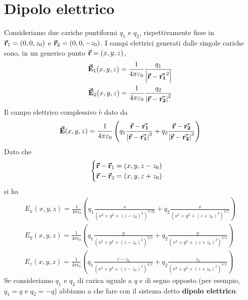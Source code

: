 \section{Dipolo elettrico}
Consideriamo due cariche puntiformi $q_1$ e $q_2$, rispettivamente fisse in $\vb*{\va{r}}_1=\left(0,0,z_0\right)$ e $\vb*{\va{r}}_2=\left(0,0,-z_0\right)$. I campi elettrici generati dalle singole cariche sono, in un generico punto $\vb*{\va{r}}=(x,y,z)$,
\begin{gather*}
	\vb*{\va{E}}_1(x,y,z)=\frac{1}{4\pi\varepsilon_0}\frac{q_1}{\abs{\vb*{\va{r}}-\vb*{\va{r_1}}^2}}\\
	\vb*{\va{E}}_2(x,y,z)=\frac{1}{4\pi\varepsilon_0}\frac{q_2}{\abs{\vb*{\va{r}}-\vb*{\va{r_2}}}^2}
\end{gather*}
Il campo elettrico complessivo è dato da
\begin{equation}
	\vb*{\va{E}}(x,y,z)=\frac{1}{4\pi\varepsilon_0}\left(q_1\frac{\vb*{\va{r}}-\vb*{\va{r_1}}}{\abs{\vb*{\va{r}}-\vb*{\va{r_1}}}^3}+q_2\frac{\vb*{\va{r}}-\vb*{\va{r_2}}}{\abs{\vb*{\va{r}}-\vb*{\va{r_2}}}^3}\right)
\end{equation}
Dato che
\begin{equation*}
	\begin{cases}
		\vb*{\va{r}}-\vb*{\va{r}}_1=\left(x,y,z-z_0\right)\\
		\vb*{\va{r}}-\vb*{\va{r}}_2=\left(x,y,z+z_0\right)
	\end{cases}
\end{equation*}
si ha
\begin{gather*}
	E_x(x,y,z)=\frac{1}{4\pi\epsilon_0}\left(q_1\frac{x}{(x^2+y^2+(z-z_0)^2)^{3/2y}}+q_2\frac{x}{(x^2+y^2+(z+z_0)^2)^{3/2}}\right)\\
	E_y(x,y,z)=\frac{1}{4\pi\epsilon_0}\left(q_1\frac{y}{(x^2+y^2+(z-z_0)^2)^{3/2}}+q_2\frac{y}{(x^2+y^2+(z+z_0)^2)^{3/2}}\right)\\
	E_z(x,y,z)=\frac{1}{4\pi\epsilon_0}\left(q_1\frac{z-z_0}{(x^2+y^2+(z-z_0)^2)^{3/2}}+q_2\frac{z_0}{(x^2+y^2+(z+z_0)^2)^{3/2}}\right)
\end{gather*}
Se consideriamo $q_1$ e $q_2$ di carica uguale a $q$ e di segno opposto (per esempio, $q_1=q$ e $q_2=-q$) abbiamo a che fare con il sistema detto \textbf{dipolo elettrico}.
